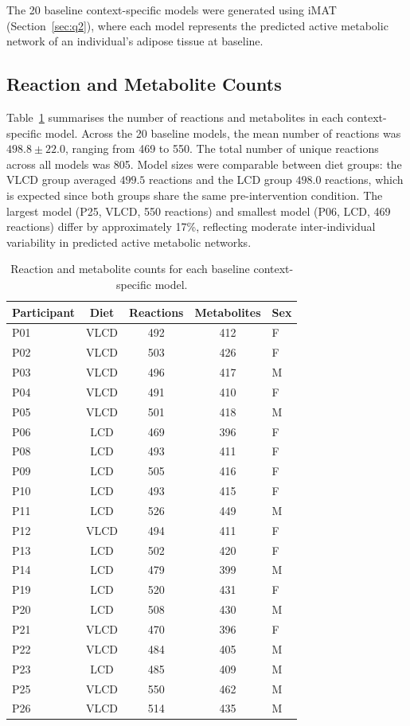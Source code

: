 \documentclass[11pt, a4paper]{article}
\begin{document}
The 20 baseline context-specific models were generated using iMAT (Section~\ref{sec:q2}), where each model represents the predicted active metabolic network of an individual's adipose tissue at baseline.

\subsection{Reaction and Metabolite Counts}

Table~\ref{tab:model_sizes} summarises the number of reactions and metabolites in each context-specific model. Across the 20 baseline models, the mean number of reactions was $498.8 \pm 22.0$, ranging from 469 to 550. The total number of unique reactions across all models was 805. Model sizes were comparable between diet groups: the VLCD group averaged $499.5$ reactions and the LCD group $498.0$ reactions, which is expected since both groups share the same pre-intervention condition. The largest model (P25, VLCD, 550 reactions) and smallest model (P06, LCD, 469 reactions) differ by approximately 17\%, reflecting moderate inter-individual variability in predicted active metabolic networks.

\begin{table}[H]
\centering
\caption{Reaction and metabolite counts for each baseline context-specific model.}
\label{tab:model_sizes}
\begin{tabular}{lcccl}
\toprule
\textbf{Participant} & \textbf{Diet} & \textbf{Reactions} & \textbf{Metabolites} & \textbf{Sex} \\
\midrule
P01 & VLCD & 492 & 412 & F \\
P02 & VLCD & 503 & 426 & F \\
P03 & VLCD & 496 & 417 & M \\
P04 & VLCD & 491 & 410 & F \\
P05 & VLCD & 501 & 418 & M \\
P06 & LCD  & 469 & 396 & F \\
P08 & LCD  & 493 & 411 & F \\
P09 & LCD  & 505 & 416 & F \\
P10 & LCD  & 493 & 415 & F \\
P11 & LCD  & 526 & 449 & M \\
P12 & VLCD & 494 & 411 & F \\
P13 & LCD  & 502 & 420 & F \\
P14 & LCD  & 479 & 399 & M \\
P19 & LCD  & 520 & 431 & F \\
P20 & LCD  & 508 & 430 & M \\
P21 & VLCD & 470 & 396 & F \\
P22 & VLCD & 484 & 405 & M \\
P23 & LCD  & 485 & 409 & M \\
P25 & VLCD & 550 & 462 & M \\
P26 & VLCD & 514 & 435 & M \\
\bottomrule
\end{tabular}
\end{table}
\end{document}
